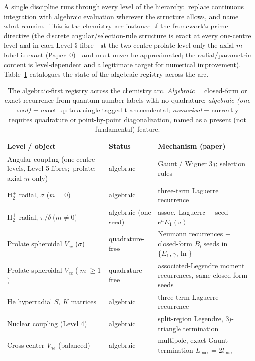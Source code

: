\documentclass[aps,pra,twocolumn,superscriptaddress,longbibliography]{revtex4-2}
\begin{document}
A single discipline runs through every level of the hierarchy:\ replace
continuous integration with algebraic evaluation wherever the structure
allows, and name what remains.  This is the chemistry-arc instance of
the framework's prime directive (the discrete angular/selection-rule
structure is exact at every one-centre level and in each Level-5
fibre---at the two-centre prolate level only the axial $m$ label is
exact (Paper~0)---and must never be approximated; the
radial/parametric content is level-dependent and a legitimate target
for numerical improvement).  Table~\ref{tab:algebraic} catalogues the
state of the algebraic registry across the arc.

\begin{table}[t]
\centering
\caption{The algebraic-first registry across the chemistry arc.
\emph{Algebraic} = closed-form or exact-recurrence from quantum-number
labels with no quadrature; \emph{algebraic (one seed)} = exact up to a
single tagged transcendental; \emph{numerical} = currently requires
quadrature or point-by-point diagonalization, named as a present (not
fundamental) feature.}
\label{tab:algebraic}
\begin{tabular}{l l l}
\toprule
Level / object & Status & Mechanism (paper) \\
\midrule
Angular coupling (one-centre levels, Level-5 fibres;\ prolate: axial $m$ only) & algebraic & Gaunt $/$ Wigner $3j$; selection rules \cite{loutey_paper13, loutey_paper15, biedenharn1981} \\
$\mathrm{H}_2^+$ radial, $\sigma$ ($m=0$) & algebraic & three-term Laguerre recurrence \cite{loutey_paper11} \\
$\mathrm{H}_2^+$ radial, $\pi/\delta$ ($m\neq0$) & algebraic (one seed) & assoc.\ Laguerre $+$ seed $e^a E_1(a)$ \cite{loutey_paper11} \\
Prolate spheroidal $V_{ee}$ ($\sigma$) & quadrature-free & Neumann recurrences $+$ closed-form $B_l$ seeds in $\{E_1,\gamma,\ln\}$ \cite{loutey_paper12} \\
Prolate spheroidal $V_{ee}$ ($|m|\ge1$) & quadrature-free & associated-Legendre moment recurrences, same closed-form seeds \cite{loutey_paper12} \\
He hyperradial $S$, $K$ matrices & algebraic & three-term Laguerre recurrence \cite{loutey_paper13} \\
Nuclear coupling (Level 4) & algebraic & split-region Legendre, $3j$-triangle termination \cite{loutey_paper15} \\
Cross-center $V_{ne}$ (balanced) & algebraic & multipole, exact Gaunt termination $L_{\max}=2l_{\max}$ \cite{loutey_paper19} \\

\end{tabular}
\end{table}
\end{document}
